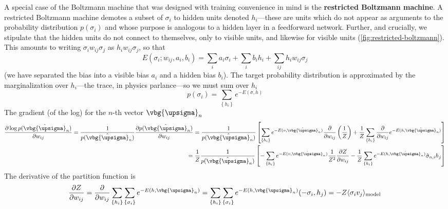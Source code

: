 \documentclass{article}
\begin{document}
A special case of the Boltzmann machine that was designed with training
convenience in mind is the \textbf{restricted Boltzmann machine}. A restricted 
Boltzmann machine demotes a subset of $ \sigma_i $ to hidden units denoted $ h_i
$---these are units which do not appear as arguments to the probability
distribution $ p(\sigma_i) $ and whose purpose is analogous to a hidden layer 
in a feedforward network. Further, and crucially, we stipulate that the 
hidden units do not connect to themselves, only to visible units, and likewise 
for visible units (\cref{fig:restricted-boltzmann}). This amounts to writing $
\sigma_i w_{ij} \sigma_j$ as $ h_i w_{ij} \sigma_j $, so that 
\begin{equation*}
	E(\sigma_i; w_{ij}, a_i, b_i)
		= \sum_i a_i \sigma_i + \sum_i b_i h_i + \sum_{ij} h_i w_{ij} \sigma_j
\end{equation*}
(we have separated the bias into a visible bias $ a_i $ and a hidden bias 
$ b_i $).
The target probability distribution is approximated by the marginalization 
over $ h_i $---the trace, in physics parlance---so we must sum over $ h_i $
\begin{equation*}
	p(\sigma_i) 
		= \sum_{\left\{h_i\right\}} e^{-E(\sigma, h)}
\end{equation*}
The gradient (of the log) for the $ n $-th vector $ \vbg{\upsigma}_n $
\begin{align*}
	\frac{\partial \log p(\hat{\vbg{\upsigma}}_n)}{\partial w_{ij}}
		= \frac{1}{p(\hat{\vbg{\upsigma}}_n)} \frac{\partial p(\hat{\vbg{\upsigma}}_n)}{\partial w_{ij}}
		= \frac{1}{p(\hat{\vbg{\upsigma}}_n)} \left[
			\sum_{\left\{h_i\right\}} e^{-E(v,\hat{\vbg{\upsigma}}_n)} 
			\frac{\partial }{\partial w_{ij}} \left(\frac{1}{Z}\right) 
			+ \frac{1}{Z} \sum_{\left\{h_i\right\}} \frac{\partial }{\partial w_{ij}}
				e^{-E(h, \hat{\vbg{\upsigma}}_n)}
		\right]
		\\ 
		= \frac{1}{Z}\frac{1}{p(\hat{\vbg{\upsigma}}_n)} \left[
			-\sum_{\left\{h_i\right\}} e^{-E(v,\hat{\vbg{\upsigma}}_n)} \frac{1}{Z^2} \frac{\partial Z }{\partial w_{ij}} 
			- \frac{1}{Z} \sum_{\left\{h_i\right\}} 
			e^{-E(h, \hat{\vbg{\upsigma}}_n)} \hat{\sigma}_{n,i} h_j
			\right]
\end{align*}
The derivative of the partition function is 
\begin{align*}
	\frac{\partial Z}{\partial w_{ij}}
		= \frac{\partial }{\partial w_{ij}} 
			\sum_{\left\{h_i\right\}}
			\sum_{\left\{\sigma_i\right\}}
			e^{-E(h, \vbg{\upsigma}_n)}
		= \sum_{\left\{h_i\right\}}
			\sum_{\left\{\sigma_i\right\}}
			e^{-E(h, \vbg{\upsigma}_n)}
			(-\sigma_i, h_j)
		= - Z \langle \sigma_i v_j \rangle_{\text{model}}
\end{align*}
\end{document}
